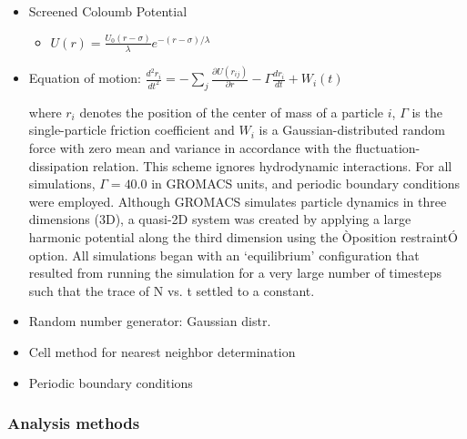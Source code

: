 \documentclass[11pt]{article}
\begin{document}
\begin{itemize}

\item Screened Coloumb Potential\\
\label{sec-3.2.2.1}

\begin{itemize}

\item $U(r)=\frac{U_0 (r-\sigma)}{\lambda} e^{-(r-\sigma)/\lambda}$\\
\label{sec-3.2.2.1.1}

\end{itemize} %

\item Equation of motion: $\frac{d^2 r_i}{dt^2}  = - \sum_j \frac{\partial{U(r_{ij})}}{{\partial r}}  - \Gamma  \frac{d r_i}{dt} + W_i (t)$\\
\label{sec-3.2.2.2}

where $r_i$ denotes the position of the center of mass of a particle $i$, $\Gamma$ is the single-particle friction coefficient and $W_i$ is a Gaussian-distributed random force with zero mean and variance in accordance with the fluctuation-dissipation relation.  This scheme ignores hydrodynamic interactions. For all simulations, $\Gamma=40.0$ in GROMACS units, and periodic boundary conditions were employed. Although GROMACS simulates particle dynamics in three dimensions (3D), a quasi-2D system was created by applying a large harmonic potential along the third dimension using the Òposition restraintÓ option. All simulations began with an `equilibrium' configuration that resulted from running the simulation for a very large number of timesteps such that the trace of N vs. t settled to a constant.

\item Random number generator: Gaussian distr.\\
\label{sec-3.2.2.3}


\item Cell method for nearest neighbor determination\\
\label{sec-3.2.2.4}


\item Periodic boundary conditions\\
\label{sec-3.2.2.5}

\end{itemize} %
\subsubsection{Analysis methods}
\label{sec-3.2.3}
\end{document}
